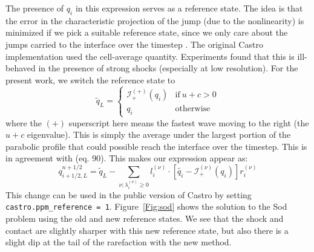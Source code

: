 \documentclass[12pt,preprint]{aastex}
\begin{document}
The presence of $q_i$ in this expression serves as a reference state.
The idea is that the error in the characteristic projection of the
jump (due to the nonlinearity) is minimized if we pick a suitable
reference state, since we only care about the jumps carried to the
interface over the timestep \citep{colellaglaz1985}.  The original
Castro implementation used the cell-average quantity.  Experiments
found that this is ill-behaved in the presence of strong shocks
(especially at low resolution). For the present work, we switch the
reference state to
\begin{equation}
\tilde{q}_L = \left \{ \begin{array}{cc}
       \mathcal{I}_+^{(+)}(q_i) & \mathrm{if~} u + c > 0 \\
       q_i                    & \mathrm{otherwise}
\end{array}
\right .
\end{equation}
where the $(+)$ superscript here means the fastest wave moving to the right
(the $u+c$ eigenvalue).   This is simply the average under the largest
portion of the parabolic profile that could possible reach the interface 
over the timestep.  This is
in agreement with \citet{ppmunsplit} (eq. 90).  This makes our
expression appear as:
\begin{equation}
q_{i+1/2,L}^{n+1/2} = \tilde{q}_L -
   \sum_{\nu;\lambda_i^{(\nu)}\ge 0} l_i^{(\nu)} \cdot \left [
        \tilde{q_i}  - \mathcal{I}^{(\nu)}_+(q_i)
       \right ] r_i^{(\nu)}
\end{equation}
This change can be used in the public version of Castro by setting
{\tt castro.ppm\_reference = 1}.  Figure~\ref{Fig:sod} shows the
solution to the Sod problem using the old and new reference states.
We see that the shock and contact are slightly sharper with this new
reference state, but also there is a slight dip at the tail of the
rarefaction with the new method.
\end{document}
